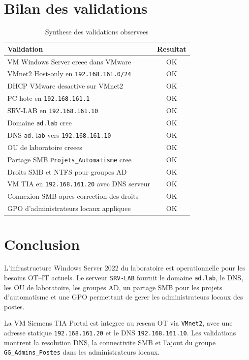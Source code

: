 \documentclass[11pt,a4paper]{article}
\begin{document}
\section{Bilan des validations}

\begin{table}[H]
\centering
\begin{tabularx}{\textwidth}{Xc}
\toprule
\textbf{Validation} & \textbf{Resultat} \\
\midrule
VM Windows Server creee dans VMware & OK \\
VMnet2 Host-only en \texttt{192.168.161.0/24} & OK \\
DHCP VMware desactive sur VMnet2 & OK \\
PC hote en \texttt{192.168.161.1} & OK \\
SRV-LAB en \texttt{192.168.161.10} & OK \\
Domaine \texttt{ad.lab} cree & OK \\
DNS \texttt{ad.lab} vers \texttt{192.168.161.10} & OK \\
OU de laboratoire creees & OK \\
Partage SMB \texttt{Projets\_Automatisme} cree & OK \\
Droits SMB et NTFS pour groupes AD & OK \\
VM TIA en \texttt{192.168.161.20} avec DNS serveur & OK \\
Connexion SMB apres correction des droits & OK \\
GPO d'administrateurs locaux appliquee & OK \\
\bottomrule
\end{tabularx}
\caption{Synthese des validations observees}
\end{table}

\section{Conclusion}

L'infrastructure Windows Server 2022 du laboratoire est operationnelle
pour les besoins OT--IT actuels. Le serveur \texttt{SRV-LAB} fournit le
domaine \texttt{ad.lab}, le DNS, les OU de laboratoire, les groupes AD,
un partage SMB pour les projets d'automatisme et une GPO permettant de
gerer les administrateurs locaux des postes.

La VM Siemens TIA Portal est integree au reseau OT via
\texttt{VMnet2}, avec une adresse statique \texttt{192.168.161.20} et le
DNS \texttt{192.168.161.10}. Les validations montrent la resolution DNS,
la connectivite SMB et l'ajout du groupe \texttt{GG\_Admins\_Postes}
dans les administrateurs locaux.
\end{document}
